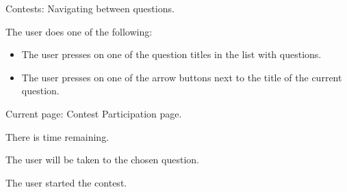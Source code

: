 \begin{uc}{Contests: Navigating between questions.}

    \begin{uc-mss}
    \item The user does one of the following:
    \begin{itemize}
        \item The user presses on one of the question titles in the list with questions.
        \item The user presses on one of the arrow buttons next to the title of the current question.
    \end{itemize}
    \end{uc-mss}

    \begin{uc-pre}
    \item Current page: Contest Participation page.
    \item There is time remaining.
    \end{uc-pre}

    \begin{uc-post}
    \item The user will be taken to the chosen question.
    \end{uc-post}

    \begin{uc-trig}
    The user started the contest.
    \end{uc-trig}

\end{uc}